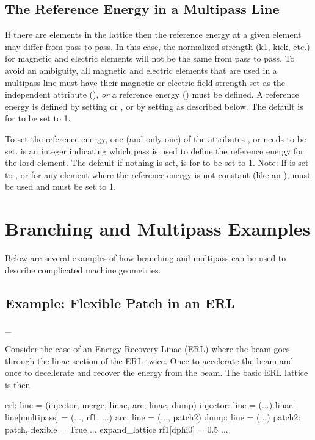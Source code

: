 \subsection{The Reference Energy in a Multipass Line}
\label{s:ref.e.multi}

If there are  elements in the lattice then the reference
energy at a given element may differ from pass to pass. In this case,
the normalized strength (k1, kick, etc.) for magnetic and electric
elements will not be the same from pass to pass. To avoid an
ambiguity, all magnetic and electric elements that are used in a
multipass line must have their magnetic or electric field strength set
as the independent attribute (), {\em or} a reference
energy () must be defined. A reference energy is
defined by setting  or , or by setting
 as described below. The default is for 
to be set to 1.

To set the reference energy, one (and only one) of the attributes
,  or  needs to be
set.  is an integer indicating which pass is used to
define the reference energy for the lord element. The default if
nothing is set, is for  to be set to 1.  Note: If
 is set to , or for any element
where the reference energy is not constant (like an ),
 must be used and must be set to 1.

\section{Branching and Multipass Examples}

Below are several examples of how branching and multipass can be used
to describe complicated machine geometries.

\subsection{Example: Flexible Patch in an ERL}
\label{s:ex.erl}

\more_\needed

Consider the case of an Energy Recovery Linac (ERL) where the beam
goes through the linac section of the ERL twice. Once to accelerate
the beam and once to decellerate and recover the energy from the
beam. The basic ERL lattice is then
\begin{example}
  erl: line = (injector, merge, linac, arc, linac, dump)
  injector: line = (...)
  linac: line[multipass] = (..., rf1, ...)
  arc: line = (..., patch2)
  dump: line = (...)
  patch2: patch, flexible = True
  ...
  expand_lattice
  rf1[dphi0] = 0.5
  ...
\end{example}

